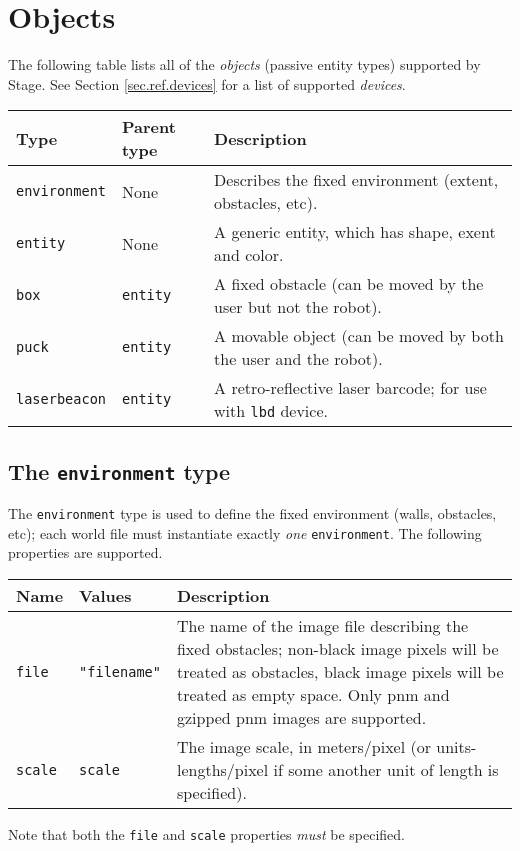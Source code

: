 \documentclass[11pt]{report}
\begin{document}
\section{Objects}
\label{sec.ref.objects}

The following table lists all of the {\em objects} (passive entity
types) supported by Stage.  See Section \ref{sec.ref.devices} for a
list of supported {\em devices}.

\begin{table}[h]
\begin{tabularx}{\columnwidth}{llX}
\hline 
Type & Parent type & Description \\
\hline 

\verb'environment' & None & Describes the fixed environment (extent,
obstacles, etc). \\

\verb'entity' & None & A generic entity, which has shape, exent and
color. \\

\hline

\verb'box' & \verb'entity' & A fixed obstacle (can be moved by the
user but not the robot). \\

\verb'puck' & \verb'entity' & A movable object (can be moved by both
the user and the robot).\\

\verb'laserbeacon' & \verb'entity' & A retro-reflective laser barcode;
for use with \verb'lbd' device.\\

\hline
\end{tabularx}
\end{table}

\subsection{The {\tt environment} type}

The \verb'environment' type is used to define the fixed environment
(walls, obstacles, etc); each world file must instantiate exactly {\em
one} \verb'environment'.  The following properties are supported.


\begin{table}[h]
\begin{tabularx}{\columnwidth}{llX}
\hline
Name & Values & Description \\
\hline

\verb'file' & \verb'"filename"' & The name of the image file
describing the fixed obstacles; non-black image pixels will be treated
as obstacles, black image pixels will be treated as empty space.  Only
pnm and gzipped pnm images are supported.\\

\verb'scale' & \verb'scale' & The image scale, in meters/pixel (or
units-lengths/pixel if some another unit of length is specified).\\

\hline
\end{tabularx}
\end{table}
\noindent Note that both the \verb'file' and \verb'scale'
properties {\em must} be specified.
\end{document}
